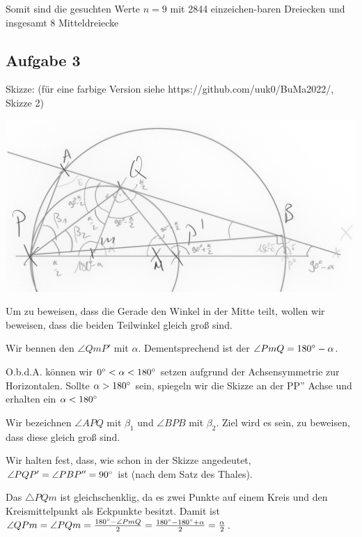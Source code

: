 \documentclass[11pt]{article}
\begin{document}
    \bigskip

    Somit sind die gesuchten Werte $n=9$ mit 2844 einzeichen-baren Dreiecken und insgesamt 8 Mitteldreiecke

    \newpage

    \subsection*{Aufgabe 3}

    Skizze: (für eine farbige Version siehe https://github.com/uuk0/BuMa2022/, Skizze 2)

    \includegraphics{"Aufgabe3_Skizze2_grayscale.jpg"}

    Um zu beweisen, dass die Gerade den Winkel in der Mitte teilt, wollen wir beweisen, dass die beiden Teilwinkel
    gleich groß sind.

    Wir bennen den $\angle QmP'$ mit $\alpha$.
    Dementsprechend ist der $\angle PmQ = 180 \degree - \alpha$.

    O.b.d.A. können wir $0 \degree < \alpha < 180 \degree$ setzen aufgrund der Achsensymmetrie zur Horizontalen.
    Sollte $\alpha > 180\degree$ sein, spiegeln wir die Skizze an der PP'' Achse und erhalten ein $\alpha < 180 \degree$

    Wir bezeichnen $\angle APQ$ mit $\beta_1$ und $\angle BPB$ mit $\beta_2$.
    Ziel wird es sein, zu beweisen, dass diese gleich groß sind.

    Wir halten fest, dass, wie schon in der Skizze angedeutet, $\angle PQP' = \angle PBP'' = 90 \degree$ ist (nach dem
    Satz des Thales).

    Das $\triangle PQm$ ist gleichschenklig, da es zwei Punkte auf einem Kreis und den Kreismittelpunkt als Eckpunkte besitzt.
    Damit ist $\angle QPm = \angle PQm = \frac{180 \degree - \angle PmQ}{2} = \frac{180\degree - 180 \degree + \alpha}{2} = \frac{\alpha}{2}$.
\end{document}
